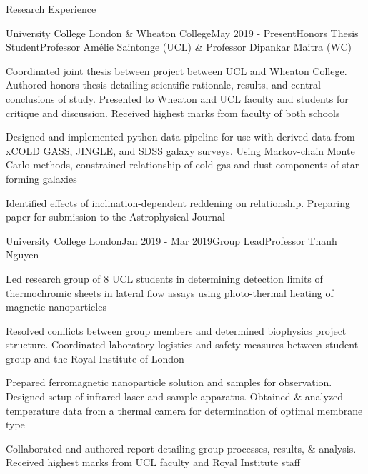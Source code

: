 \documentclass{resume} %
\begin{document}
\begin{rSection}{Research Experience}
\begin{rSubsection}{University College London \& Wheaton College}{May 2019 - Present}{Honors Thesis Student}{Professor Am\'{e}lie Saintonge (UCL) \& Professor Dipankar Maitra (WC)}

\item Coordinated joint thesis between project between UCL and Wheaton College. Authored honors thesis detailing scientific rationale, results, and central conclusions of study. Presented to Wheaton and UCL faculty and students for critique and discussion. Received highest marks from faculty of both schools
\item Designed and implemented python data pipeline for use with derived data from xCOLD GASS, JINGLE, and SDSS galaxy surveys. Using Markov-chain Monte Carlo methods, constrained relationship of cold-gas and dust components of star-forming galaxies
\item Identified effects of inclination-dependent reddening on relationship. Preparing paper for submission to the Astrophysical Journal
\end{rSubsection}

\begin{rSubsection}{University College London}{Jan 2019 - Mar 2019}{Group Lead}{Professor Thanh Nguyen}
\item Led research group of 8 UCL students in determining detection limits of thermochromic sheets in lateral flow assays using photo-thermal heating of magnetic nanoparticles
\item Resolved conflicts between group members and determined biophysics project structure. Coordinated laboratory logistics and safety measures between student group and the Royal Institute of London
\item Prepared ferromagnetic nanoparticle solution and samples for observation. Designed setup of infrared laser and sample apparatus. Obtained \& analyzed temperature data from a thermal camera for determination of optimal membrane type
\item Collaborated and authored report detailing group processes, results, \& analysis. Received highest marks from UCL faculty and Royal Institute staff
\end{rSubsection}


\end{rSection}
\end{document}
